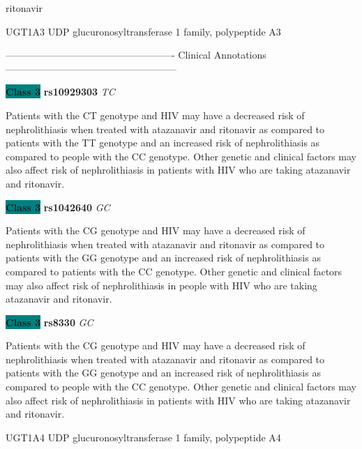 \documentclass{resume} %
\begin{document}
\begin{rSection}{ ritonavir }
\begin{rSubsection}{ UGT1A3 }{ UDP glucuronosyltransferase 1 family, polypeptide A3 }{}{}
\item[] ---------------------------------------------------- Clinical Annotations -----------------------------------------------------\newline
\item \textbf{\colorbox{teal} {Class 3}} \textbf{ rs10929303 } \textit{ TC }
\item[] Patients with the CT genotype and HIV may have a decreased risk of nephrolithiasis when treated with atazanavir and ritonavir as compared to patients with the TT genotype and an increased risk of nephrolithiasis as compared to people with the CC genotype. Other genetic and clinical factors may also affect risk of nephrolithiasis in patients with HIV who are taking atazanavir and ritonavir. \item \textbf{\colorbox{teal} {Class 3}} \textbf{ rs1042640 } \textit{ GC }
\item[] Patients with the CG genotype and HIV may have a decreased risk of nephrolithiasis when treated with atazanavir and ritonavir as compared to patients with the GG genotype and an increased risk of nephrolithiasis as compared to patients with the CC genotype. Other genetic and clinical factors may also affect risk of nephrolithiasis in people with HIV who are taking atazanavir and ritonavir.\item \textbf{\colorbox{teal} {Class 3}} \textbf{ rs8330 } \textit{ GC }
\item[] Patients with the CG genotype and HIV may have a decreased risk of nephrolithiasis when treated with atazanavir and ritonavir as compared to patients with the GG genotype and an increased risk of nephrolithiasis as compared to people with the CC genotype. Other genetic and clinical factors may also affect risk of nephrolithiasis in patients with HIV who are taking atazanavir and ritonavir.
\end{rSubsection}\begin{rSubsection}{ UGT1A4 }{ UDP glucuronosyltransferase 1 family, polypeptide A4 }{}{}
\item[]


\end{rSubsection}
\end{rSection}
\end{document}
